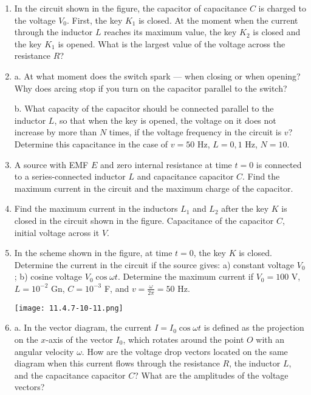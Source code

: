 \documentclass{article}
\begin{document}
\begin{enumerate}[label=11.4.\arabic*]
\item In the circuit shown in the figure, the capacitor of capacitance $C$ is charged to the voltage $V_0$. First, the key $K_1$ is closed. At the moment when the current through the inductor $L$ reaches its maximum value, the key $K_2$ is closed and the key $K_1$ is opened. What is the largest value of the voltage across the resistance $R$?

\item a. At what moment does the switch spark — when closing or when opening? Why does arcing stop if you turn on the capacitor parallel to the switch? 

b. What capacity of the capacitor should be connected parallel to the inductor $L$, so that when the key is opened, the voltage on it does not increase by more than $N$ times, if the voltage frequency in the circuit is $v$? Determine this capacitance in the case of $v = 50$ Hz, $L = 0, 1$ Hz, $N = 10$.

\item A source with EMF $E$ and zero internal resistance at time $t = 0$ is connected to a series-connected inductor $L$ and capacitance capacitor $C$. Find the maximum current in the circuit and the maximum charge of the capacitor.

\item Find the maximum current in the inductors $L_1$ and $L_2$ after the key $K$ is closed in the circuit shown in the figure. Capacitance of the capacitor $C$, initial voltage across it $V$.

\item In the scheme shown in the figure, at time $t = 0$, the key $K$ is closed. Determine the current in the circuit if the source gives: a) constant voltage $V_0$; b) cosine voltage $V_0 \cos \omega t$. Determine the maximum current if $V_0 = 100$ V, $L = 10^{-2}$ Gn, $C = 10^{-3}$ F, and $v = \frac{\omega}{2 \pi} = 50$ Hz.

\begin{center}
    \texttt{[image: 11.4.7-10-11.png]}
\end{center}

\item a. In the vector diagram, the current $I = I_0 \cos \omega t$ is defined as the projection on the $x$-axis of the vector $I_0$, which rotates around the point $O$ with an angular velocity $\omega$. How are the voltage drop vectors located on the same diagram when this current flows through the resistance $R$, the inductor $L$, and the capacitance capacitor $C$? What are the amplitudes of the voltage vectors?


\end{enumerate}
\end{document}
